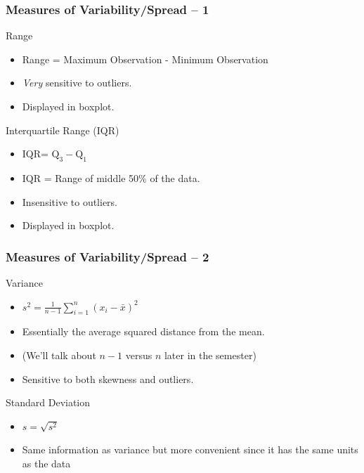 \begin{frame}
\frametitle{Measures of Variability/Spread -- 1}

\begin{block}{Range}
  \begin{itemize}
    \item Range = Maximum Observation - Minimum Observation
    \item \emph{Very} sensitive to outliers. 
    \item Displayed in boxplot.
  \end{itemize}
\end{block}

\begin{block}{Interquartile Range (IQR)}
  \begin{itemize}
    \item IQR= $\mbox{Q}_3 - \mbox{Q}_1$
    \item IQR = Range of middle 50\% of the data. 
    \item Insensitive to outliers.  
    \item Displayed in boxplot.
  \end{itemize}
\end{block}
\end{frame}

\begin{frame}
\frametitle{Measures of Variability/Spread -- 2}
\begin{block}{Variance}
  \begin{itemize}
    \item $\displaystyle s^2 = \frac{1}{n-1} \sum_{i=1}^n (x_i - \bar{x})^2$
    \item Essentially the average squared distance from the mean. 
    \item (We'll talk about $n-1$ versus $n$ later in the semester)
    \item Sensitive to both skewness and outliers.
  \end{itemize}
\end{block}

 \begin{block}{Standard Deviation}
   \begin{itemize}
	    \item $s = \sqrt{s^2}$
      \item Same information as variance but more convenient since it has the \alert{same units as the data}
   \end{itemize}
\end{block}
\end{frame}

